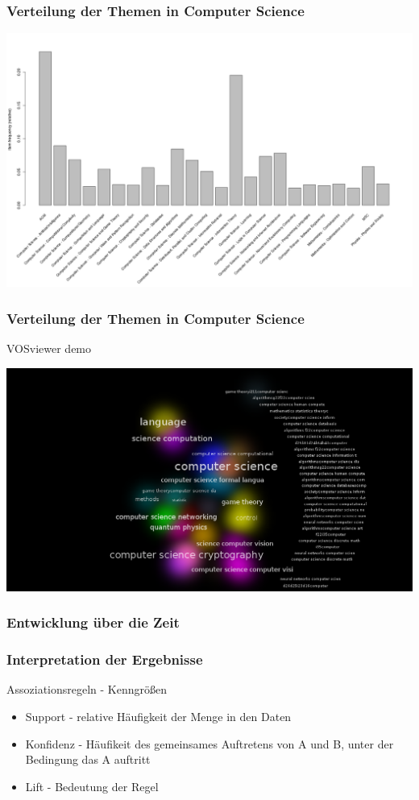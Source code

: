 \documentclass[12pt, xcolor=table]{beamer}
\begin{document}
\begin{frame}
	\frametitle{Verteilung der Themen in Computer Science}
	\begin{center}
		\includegraphics[scale=0.25]{../../visual/csFrequent_filter_acm_and_msc.png}
	\end{center}
\end{frame}
\begin{frame}
	\frametitle{Verteilung der Themen in Computer Science}
    VOSviewer demo
	\begin{center}
		\includegraphics[scale=0.25]{../../visual/cs_subs_cluster_density.png}
	\end{center}
\end{frame}
\begin{frame}
	\frametitle{Entwicklung über die Zeit}
\end{frame}
\begin{frame}
	\frametitle{Interpretation der Ergebnisse}
    \begin{block}{Assoziationsregeln - Kenngrößen}
    \begin{center}
        \begin{itemize}
			\item Support - relative Häufigkeit der Menge in den Daten
			\item Konfidenz - Häufikeit des gemeinsames Auftretens von A und B, unter der Bedingung das A auftritt
			\item Lift - Bedeutung der Regel
	    \end{itemize}
    \end{center}
    \end{block}
\end{frame}
\end{document}
